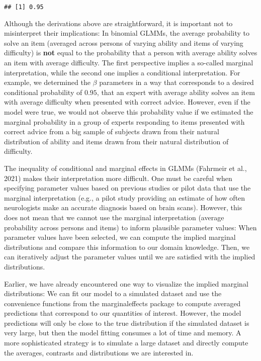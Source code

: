 \documentclass[
  man,floatsintext]{apa6}
\begin{document}
\begin{verbatim}
## [1] 0.95
\end{verbatim}

Although the derivations above are straightforward, it is important not to misinterpret their implications: In binomial GLMMs, the average probability to solve an item (averaged across persons of varying ability and items of varying difficulty) is \textbf{not} equal to the probability that a person with average ability solves an item with average difficulty. The first perspective implies a so-called marginal interpretation, while the second one implies a conditional interpretation. For example, we determined the \(\beta\) parameters in a way that corresponds to a desired conditional probability of \(0.95\), that an expert with average ability solves an item with average difficulty when presented with correct advice. However, even if the model were true, we would not observe this probability value if we estimated the marginal probability in a group of experts responding to items presented with correct advice from a big sample of subjects drawn from their natural distribution of ability and items drawn from their natural distribution of difficulty.

The inequality of conditional and marginal effects in GLMMs (Fahrmeir et al., 2021) makes their interpretation more difficult. One must be careful when specifying parameter values based on previous studies or pilot data that use the marginal interpretation (e.g., a pilot study providing an estimate of how often neurologists make an accurate diagnosis based on brain scans). However, this does not mean that we cannot use the marginal interpretation (average probability across persons and items) to inform plausible parameter values: When parameter values have been selected, we can compute the implied marginal distributions and compare this information to our domain knowledge. Then, we can iteratively adjust the parameter values until we are satisfied with the implied distributions.

Earlier, we have already encountered one way to visualize the implied marginal distributions: We can fit our model to a simulated dataset and use the convenience functions from the marginaleffects package to compute averaged predictions that correspond to our quantities of interest. However, the model predictions will only be close to the true distribution if the simulated dataset is very large, but then the model fitting consumes a lot of time and memory. A more sophisticated strategy is to simulate a large dataset and directly compute the averages, contrasts and distributions we are interested in.
\end{document}
